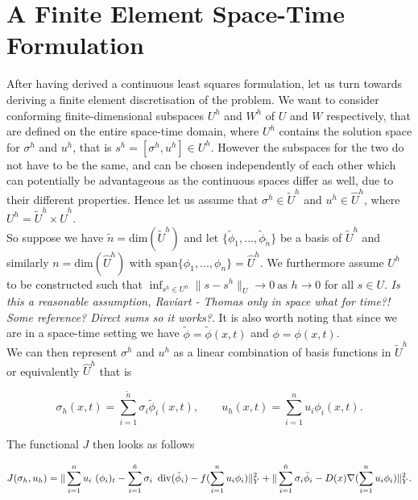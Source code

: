 \documentclass[../draft_1.tex]{subfiles}
\begin{document}
\section{A Finite Element Space-Time Formulation}

After having derived a continuous least squares formulation, let us turn towards deriving a finite element discretisation of the problem. We want to consider conforming finite-dimensional subspaces $U^h$ and $W^h$ of $U$ and $W$ respectively, that are defined on the entire space-time domain, where $U^h$ contains the solution space for $\sigma^h$ and $u^h$, that is $s^h = [\sigma^h, u^h] \in U^h$. However the subspaces for the two do not have to be the same, and can be chosen independently of each other which can potentially be advantageous as the continuous spaces differ as well, due to their different properties. Hence let us assume that $\sigma^h \in \tilde{U}^h$ and $u^h \in \hat{U}^h$, where $ U^h = \tilde{U}^h \times \hat{U}^h$. 
\smallskip
\\ 
So suppose we have $\tilde{n} = \text{dim}(\tilde{U}^h)$ and let $ \{\tilde{\phi}_1, ..., \tilde{\phi}_{\tilde{n}}\} $ be a basis of $\tilde{U}^h$ and similarly $n = \text{dim}(\hat{U}^h)$ with $\text{span} \{\phi_1, ..., \phi_n\}  = \hat{U}^h$. We furthermore assume $U^h$ to be constructed such that $\inf_{s^h \in U^h} \| s - s^h\|_U \rightarrow 0 \ \text{as } h \rightarrow 0$ for all $s \in U$. \textit{Is this a reasonable assumption, Raviart - Thomas only in space what for time?! Some reference? Direct sums so it works?}. It is also worth noting that since we are in a space-time setting we have $\tilde{\phi} = \tilde{\phi}(x,t)$ and  $\phi = \phi(x,t)$.
\smallskip
\\ 
We can then represent $\sigma^h$ and $u^h$ as a linear combination of basis functions in $\tilde{U}^h$ or equivalently $\hat{U}^h$ that is
\begin{ceqn}
	\begin{equation}
 	\sigma_h(x,t) = \sum_{i = 1}^{\tilde{n}} \sigma_i \tilde{\phi}_i(x,t), \qquad 
	u_h(x,t) = \sum_{i = 1}^{n} u_i \phi_i(x,t). 
	\end{equation}
\end{ceqn}
The functional $J$ then looks as follows 
\begin{ceqn}
	\begin{equation}
J(\sigma_h, u_h) =\| \sum_{i=1}^{n} u_i \ (\phi_i)_t - \sum_{i=1}^{\tilde{n}} \sigma_i \ \mathop{}\!\mathrm{div}(\tilde{\phi}_i) - f(\sum_{i=1}^{n} u_i \phi_i) \|_Y^2 + \| \sum_{i=1}^{\tilde{n}} \sigma_i \tilde{\phi}_i - D(x) \nabla (\sum_{i=1}^{n} u_i \phi_i) \| _Y^2.
	\end{equation}
\end{ceqn}
\end{document}
